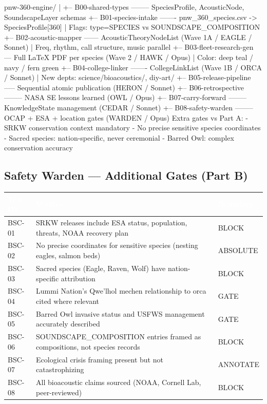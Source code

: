 \documentclass[11pt,letterpaper]{article}
\newcommand{\tblhdr}[1]{\textbf{\sffamily\textcolor{white}{#1}}}
\begin{document}
\begin{asciibox}
pnw-360-engine/
|
+-- B00-shared-types -------- SpeciesProfile, AcousticNode, SoundscapeLayer schemas
+-- B01-species-intake ------- pnw_360_species.csv -> SpeciesProfile[360]
|                              Flags: type=SPECIES vs SOUNDSCAPE_COMPOSITION
+-- B02-acoustic-mapper ------ AcousticTheoryNodeList (Wave 1A / EAGLE / Sonnet)
|                              Freq, rhythm, call structure, music parallel
+-- B03-fleet-research-gen --- Full LaTeX PDF per species (Wave 2 / HAWK / Opus)
|                              Color: deep teal / navy / fern green
+-- B04-college-linker ------- CollegeLinkList (Wave 1B / ORCA / Sonnet)
|                              New depts: science/bioacoustics/, diy-art/
+-- B05-release-pipeline ----- Sequential atomic publication (HERON / Sonnet)
+-- B06-retrospective -------- NASA SE lessons learned (OWL / Opus)
+-- B07-carry-forward -------- KnowledgeState management (CEDAR / Sonnet)
+-- B08-safety-warden -------- OCAP + ESA + location gates (WARDEN / Opus)
                               Extra gates vs Part A:
                               - SRKW conservation context mandatory
                               - No precise sensitive species coordinates
                               - Sacred species: nation-specific, never ceremonial
                               - Barred Owl: complex conservation accuracy
\end{asciibox}

\subsection{Safety Warden — Additional Gates (Part B)}

\begin{center}
\begin{tabularx}{\textwidth}{L{2cm}XL{2.5cm}}
\toprule
{}
\tblhdr{Test ID} & \tblhdr{Verifies} & \tblhdr{Boundary} \\
\midrule
BSC-01 & SRKW releases include ESA status, population, threats, NOAA recovery plan & BLOCK \\
BSC-02 & No precise coordinates for sensitive species (nesting eagles, salmon beds) & ABSOLUTE \\
BSC-03 & Sacred species (Eagle, Raven, Wolf) have nation-specific attribution & BLOCK \\
BSC-04 & Lummi Nation's Qwe'lhol mechen relationship to orca cited where relevant & GATE \\
BSC-05 & Barred Owl invasive status and USFWS management accurately described & GATE \\
BSC-06 & SOUNDSCAPE\_COMPOSITION entries framed as compositions, not species records & BLOCK \\
BSC-07 & Ecological crisis framing present but not catastrophizing & ANNOTATE \\
BSC-08 & All bioacoustic claims sourced (NOAA, Cornell Lab, peer-reviewed) & BLOCK \\
\bottomrule
\end{tabularx}
\end{center}
\end{document}
